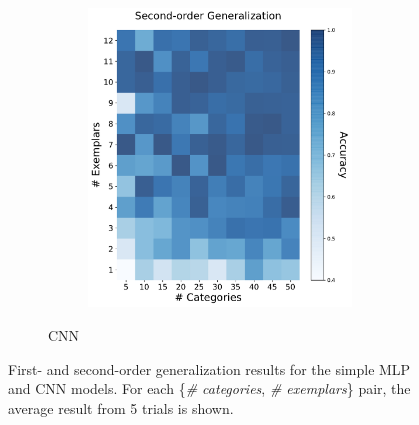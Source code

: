 \begin{figure}[h]
\begin{center}
\begin{subfigure}[b]{0.47\textwidth}
\begin{center}
\begin{subfigure}[b]{0.48\textwidth}
\begin{center}
                        \includegraphics[width=\textwidth]{figures/cnn_2order_accuracy.pdf}
                    \end{center}
                \end{subfigure}
            \end{center}
            \caption{CNN}
            \label{cnn_results}
        \end{subfigure}
    \end{center}
    \caption{First- and second-order generalization results for the simple MLP and CNN models.
    For each \{\textit{\# categories}, \textit{\# exemplars}\} pair, the average result from
    5 trials is shown.}
    \label{generalization_results}
\end{figure}

